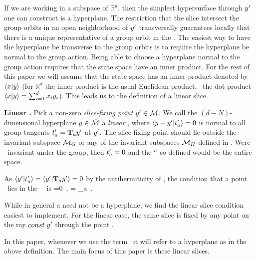 {If we are working in a subspace of $\mathbb{R}^d$, then the simplest hypersurface through ${y'}$ one can construct is a hyperplane. The restriction that the slice intersect the group orbits in an open neighborhood of ${y'}$ transversally guarantees locally that there is a unique representative of a group orbit in the \slice. The easiest way to have the hyperplane be transverse to the group orbits is to require the hyperplane be normal to the group action.
Being able to choose a hyperplane normal to the group action requires that the state space have an inner product. For the rest of this paper we will assume that the state space has an inner product denoted by $\left\langle {x}|{y} \right\rangle$ (for $\mathbb{R}^d$ the inner product is the usual Euclidean product, \ie\ the dot product $\left\langle {x}|{y} \right\rangle=\sum_{i=1}^d x_i y_i$).
This leads us to the definition of a linear slice.

\begin{definition}
\label{def:slice}
\textbf{Linear \slice.}
Pick a non-zero \emph{slice-fixing point} ${y'} \in {\cal M}$.
We call the $(d\!-\!N)$-dimensional hyperplane $y \in \bar{\cal M}$
a \emph{linear \slice}, where
\(
\left\langle {\ensuremath{y}- {\ensuremath{y'}}}|{t'_{a}} \right\rangle=0
\) %
is normal to all group tangents $ t'_{a}= \mathbf{T}_a {y'}$ at ${y'}$. The {slice-fixing point} should lie outside the invariant subspace ${\cal M}_{G}$ or any of the invariant subspaces ${\cal M}_H$ defined in . Were \slicep\ invariant under the group, then $t'_{a}=0$ and the `\slice' so defined would be the entire space.

As $ \left\langle {{\ensuremath{y'}}}|{t'_{a}} \right\rangle=\left\langle {{\ensuremath{y'}}}|{\mathbf{T}_a {y'}} \right\rangle =0 $ by the antihermiticity of \Lg, the condition that a point \sspRed\ lies in the \slice\ \pSRed\ is
\beq
{}=0
    \,,\qquad
{} = \Lg_a \slicep
\,.
\end{definition}


While in general a {\slice} need not be a hyperplane,
we find the linear slice condition  easiest to implement.
For the linear case, the same slice is fixed by any
point on the ray $const\; {y'}$ through the point \slicep.

In this paper, whenever we use the term \slice\ it will refer to a hyperplane as in the above definition. The main focus of this paper is these linear slices.

}
